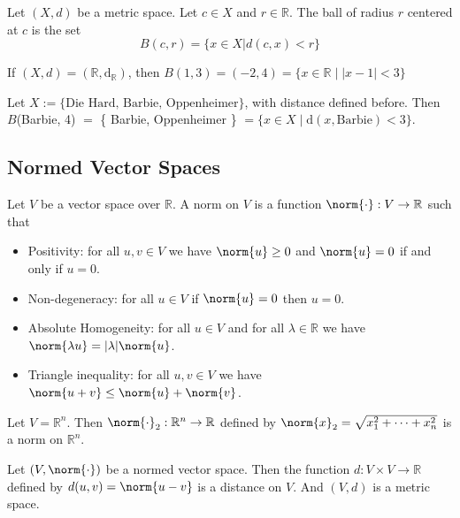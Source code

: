 \begin{definition}
    Let $(X,d)$ be a metric space. Let $c \in X$ and $r \in \mathbb{R}$. The ball of radius $r$ centered at $c$ is the set
    $$ B(c,r) = \{ x \in X | d(c,x) < r \} $$
\end{definition}

\begin{example}
    If $(X,d) = (\mathbb{R}, \text{d}_\mathbb{R})$, then $B(1,3) = (-2,4) = \{x \in \mathbb{R} \mid |x-1| < 3\}$
\end{example}

\begin{example}
    Let $X := \{\text{Die Hard, Barbie, Oppenheimer}\}$, with distance defined before. 
    Then $B$(Barbie, 4)  $=$ \{ Barbie, Oppenheimer \} $= \{x \in X \mid \text{d}(x, \text{Barbie}) < 3\}$.
\end{example}

\subsection{Normed Vector Spaces}

\begin{definition}[norm]
    Let $V$ be a vector space over $\mathbb{R}$. A norm on $V$ is a function
    $\norm{ \cdot }: V \to \mathbb{R}$ such that

    \begin{itemize}
        \item Positivity: for all $u,v \in V$ we have $\norm{ u } \geq 0$ and $\norm{ u } = 0$ if and only if $u = 0$.
        \item Non-degeneracy: for all $u \in V$ if $\norm{ u } = 0$ then $u = 0$.
        \item Absolute Homogeneity: for all $u \in V$ and for all $\lambda \in \mathbb{R}$ we have $\norm{ \lambda u } = |\lambda| \norm{ u }$.
        \item Triangle inequality: for all $u,v \in V$ we have $\norm{ u+v } \leq \norm{ u } + \norm{ v }$.
    \end{itemize}
\end{definition}

\begin{example}
    Let $V = \mathbb{R}^n$. Then $\norm{ \cdot }_2: \mathbb{R}^n \to \mathbb{R}$ defined by $\norm{ x }_2 = \sqrt{x_1^2 + \cdots + x_n^2}$ is a norm on $\mathbb{R}^n$.
\end{example}

\begin{proposition}
    Let $(V, \norm{ \cdot })$ be a normed vector space. 
    Then the function $d: V \times V \to \mathbb{R}$ defined by $d(u,v) = \norm{ u-v }$ is a distance on $V$.
    And $(V,d)$ is a metric space.
\end{proposition}

